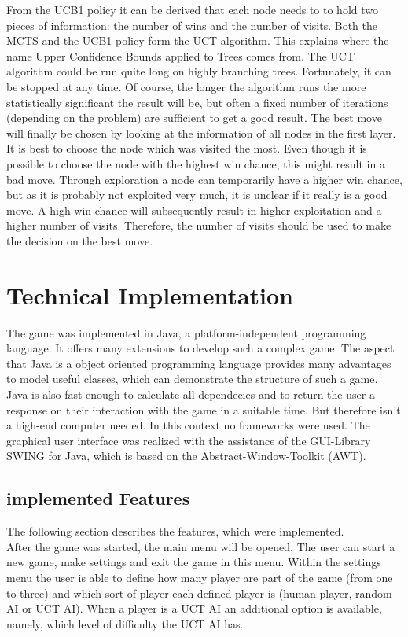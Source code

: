 \documentclass[english]{report}
\begin{document}
From the UCB1 policy it can be derived that each node needs to to hold two
pieces of information: the number of wins and the number of visits.
Both the MCTS and the UCB1 policy form the UCT algorithm. This explains where
the name Upper Confidence Bounds applied to Trees comes from. The UCT algorithm
could be run quite long on highly branching trees. Fortunately, it can be
stopped at any time. Of course, the longer the algorithm runs the more
statistically significant the result will be, but often a fixed number of
iterations (depending on the problem) are sufficient to get a good result.
The best move will finally be chosen by looking at the information of all nodes
in the first layer. It is best to choose the node which was visited the most.
Even though it is possible to choose the node with the highest win chance, this
might result in a bad move. Through exploration a node can temporarily have a
higher win chance, but as it is probably not exploited very much, it is unclear
if it really is a good move. A high win chance will subsequently result in
higher exploitation and a higher number of visits. Therefore, the number of
visits should be used to make the decision on the best move.


\chapter{Technical Implementation}
\label{sec:technImplementation}
The game was implemented in Java, a platform-independent programming language.
It offers many extensions to develop such a complex game. The aspect that Java
is a object oriented programming language provides many advantages to model
useful classes, which can demonstrate the structure of such a game. Java is also
fast enough to calculate all dependecies and to return the user a
response on their interaction with the game in a suitable time. But therefore
isn't a high-end computer needed. In this context no frameworks were used. The
graphical user interface was realized with the assistance of the GUI-Library
SWING for Java, which is based on the Abstract-Window-Toolkit (AWT).  
\section{implemented Features}
The following section describes the features, which were implemented. \\
After the game was started, the main menu will be opened. The user can start a new game, make settings and exit the game in this menu. Within the settings menu the user is able to define how many player are part of the game (from one to three) and which sort of player each defined player is (human player, random AI or UCT AI). When a player is a UCT AI an additional option is available, namely, which level of difficulty the UCT AI has.
\newpage
\end{document}
